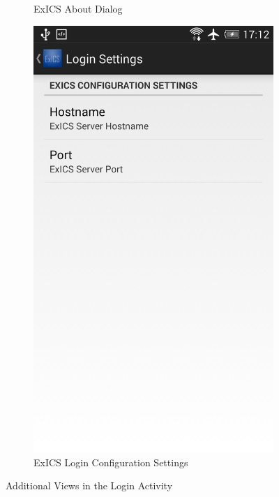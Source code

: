 \begin{figure}[h]
\begin{subfigure}[b]{0.35\textwidth}
		\caption{ExICS About Dialog}
		\label{subfig:login_about}
	\end{subfigure}
	\begin{subfigure}[b]{0.35\textwidth}
		\includegraphics[width=\textwidth]{"screenshots/login_settings"}
		\caption{ExICS Login Configuration Settings}
		\label{subfig:login_settings}
	\end{subfigure}
	\caption{Additional Views in the Login Activity}
	\label{fig:exics_about_settings}
\end{figure}

